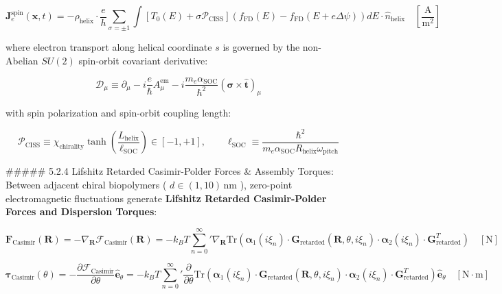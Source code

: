 \documentclass[11pt,a4paper]{article}
\theoremstyle{definition}
\theoremstyle{remark}
\begin{document}
\begin{equation}
\boxed{\mathbf{J}_{e}^{\text{spin}}(\mathbf{x}, t) = -\rho_{\text{helix}} \cdot \frac{e}{h} \sum_{\sigma = \pm 1} \int [ T_0(E) + \sigma \mathcal{P}_{\text{CISS}} ] \left( f_{\text{FD}}(E) - f_{\text{FD}}(E + e \Delta\psi) \right) dE \cdot \hat{n}_{\text{helix}} \quad [\frac{\mathrm{A}}{\mathrm{m^2}}]}
\end{equation}


where electron transport along helical coordinate $s$ is governed by the non-Abelian $SU(2)$ spin-orbit covariant derivative:


\begin{equation}
\mathcal{D}_\mu \equiv \partial_\mu - i \frac{e}{\hbar} A_\mu^{\text{em}} - i \frac{m_e \alpha_{\text{SOC}}}{\hbar^2} (\boldsymbol{\sigma} \times \hat{\mathbf{t}})_\mu
\end{equation}


with spin polarization and spin-orbit coupling length:


\begin{equation}
\mathcal{P}_{\text{CISS}} \equiv \chi_{\text{chirality}} \tanh\left( \frac{L_{\text{helix}}}{\ell_{\text{SOC}}} \right) \in [-1, +1], \qquad \ell_{\text{SOC}} \equiv \frac{\hbar^2}{m_e \alpha_{\text{SOC}} R_{\text{helix}} \omega_{\text{pitch}}}
\end{equation}


\#\#\#\#\# 5.2.4 Lifshitz Retarded Casimir-Polder Forces \& Assembly Torques:
Between adjacent chiral biopolymers ( $d \in (1, 10) \, \mathrm{nm}$ ), zero-point electromagnetic fluctuations generate \textbf{Lifshitz Retarded Casimir-Polder Forces and Dispersion Torques}:


\begin{equation}
\boxed{\mathbf{F}_{\text{Casimir}}(\mathbf{R}) = -\nabla_{\mathbf{R}} \mathcal{F}_{\text{Casimir}}(\mathbf{R}) = -k_B T {\sum_{n=0}^\infty}' \nabla_{\mathbf{R}} \mathrm{Tr} \left( \boldsymbol{\alpha}_1(i\xi_n) \cdot \mathbf{G}_{\text{retarded}}(\mathbf{R}, \theta, i\xi_n) \cdot \boldsymbol{\alpha}_2(i\xi_n) \cdot \mathbf{G}_{\text{retarded}}^T \right) \quad [\mathrm{N}]}
\end{equation}



\begin{equation}
\boxed{\boldsymbol{\tau}_{\text{Casimir}}(\theta) = -\frac{\partial \mathcal{F}_{\text{Casimir}}}{\partial \theta} \hat{\mathbf{e}}_\theta = -k_B T {\sum_{n=0}^\infty}' \frac{\partial}{\partial \theta} \mathrm{Tr} \left( \boldsymbol{\alpha}_1(i\xi_n) \cdot \mathbf{G}_{\text{retarded}}(\mathbf{R}, \theta, i\xi_n) \cdot \boldsymbol{\alpha}_2(i\xi_n) \cdot \mathbf{G}_{\text{retarded}}^T \right) \hat{\mathbf{e}}_\theta \quad [\mathrm{N \cdot m}]}
\end{equation}
\end{document}
